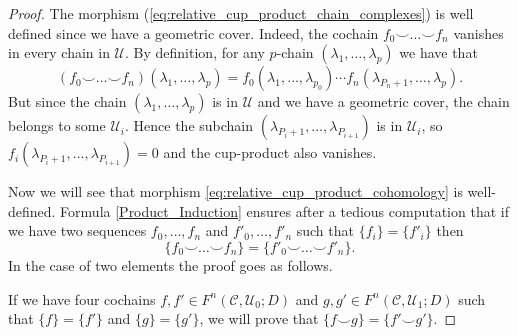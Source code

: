 \documentclass[12pt,reqno]{amsart}
\theoremstyle{definition}
\theoremstyle{remark}
\numberwithin{figure}{section}%
\newcommand{\CC}{\mathcal{C}}
\newcommand{\Uc}{\mathcal{U}}
\begin{document}
\begin{proof}
    The morphism (\ref{eq:relative_cup_product_chain_complexes})
    is well defined since we have a geometric cover. Indeed, the cochain $f_0 \smile \dots \smile f_n$ vanishes in every chain in $\Uc$. By definition, for any $p$-chain $(\lambda_1,\ldots,\lambda_{p})$ we have that
    $$(f_0 \smile \dots \smile f_n)(\lambda_1,\dots,\lambda_{p})=f_0(\lambda_1,\dots,\lambda_{p_0})  \cdots f_n(\lambda_{P_n+1},\dots,\lambda_{p}).$$ But since the chain $(\lambda_1,\ldots,\lambda_{p})$ is in $\Uc$ and we have a geometric cover, the chain belongs to some $\Uc_i$. Hence the subchain $(\lambda_{P_i+1},\dots,\lambda_{P_{i+1}})$ is in $\Uc_i$, so $f_i(\lambda_{P_i+1},\dots,\lambda_{P_{i+1}})=0$ and the cup-product also vanishes.
    
    Now we will see that morphism \eqref{eq:relative_cup_product_cohomology} is  well-defined.  Formula \eqref{Product_Induction} ensures after a tedious computation that if we have two sequences $f_0, \dots, f_n$ and $f'_0, \dots, f'_n$ such that $\{f_i\}=\{f'_i\}$ then $$\{f_0 \smile \dots \smile f_n\}=\{f'_0 \smile \dots \smile f'_n\}.$$ 
    In the case of two elements the proof goes as follows. 
    
    If we have four cochains $f, f' \in F^n(\CC,\Uc_0;D)$ and $g, g' \in F^n(\CC,\Uc_1;D)$ such that $\{f\}=\{f'\}$ and $\{g\}=\{g'\}$, we will prove that $\{f \smile g\}=\{f'\smile g'\}$. 
    

\end{proof}
\end{document}
